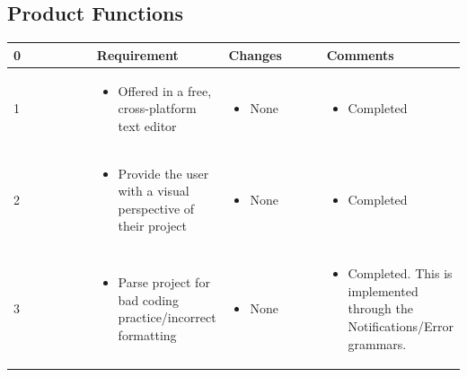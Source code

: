 \documentclass[letterpaper,10pt,titlepage,draftclsnofoot,onecolumn,onesided] {IEEEtran}
\begin{document}
\subsection{Product Functions}
\small{
\begin{center}
	\begin{singlespace}
		\begin{tabular}{ |  p{0.25\linewidth}  |  p{0.25\linewidth}  | p{0.25\linewidth} | p{0.25\linewidth} |}
		\hline
		0 & Requirement & Changes & Comments \\ \hline
		
			1
		& 
			\begin{itemize}
				\item Offered in a free, cross-platform text editor
			\end{itemize}
		& 
			\begin{itemize}
				\item None
			\end{itemize}
		&
			\begin{itemize}
				\item Completed
			\end{itemize} 
		
        \\ \hline

			2
		& 
			\begin{itemize}
				\item Provide the user with a visual perspective of their project
			\end{itemize}
		& 
			\begin{itemize}
				\item None
			\end{itemize}
		&
			\begin{itemize}
				\item Completed
			\end{itemize} 
		
        \\ \hline

            3
		& 
			\begin{itemize}
				\item Parse project for bad coding practice/incorrect formatting
			\end{itemize}
		& 
			\begin{itemize}
				\item None
			\end{itemize}
		&
			\begin{itemize}
				\item Completed. This is implemented through the Notifications/Error grammars.
			\end{itemize} 
		

\end{tabular}
\end{singlespace}
\end{center}}
\end{document}
